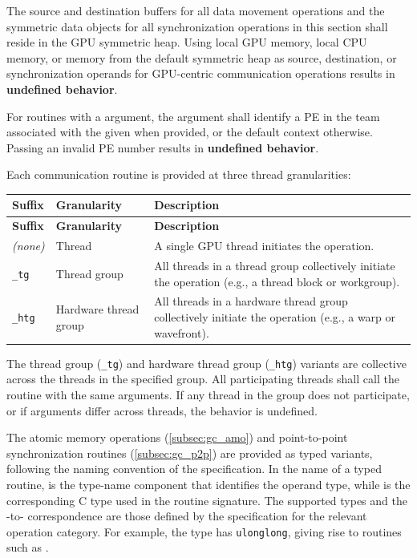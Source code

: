 
The source and destination buffers for all data movement operations and the
symmetric data objects for all synchronization operations in this section shall
reside in the \ac{GPU} symmetric heap. Using local \ac{GPU} memory, local CPU
memory, or memory from the default symmetric heap as source, destination, or
synchronization operands for GPU-centric communication operations results in
\textbf{undefined behavior}.

For routines with a  argument, the  argument shall identify a
\ac{PE} in the team associated with the given  when provided, or the
default context otherwise. Passing an invalid \ac{PE} number results in
\textbf{undefined behavior}.

Each communication routine is provided at three thread granularities:

\begin{longtable}{|p{3cm}|p{3cm}|p{8.5cm}|}
\hline
\textbf{Suffix} & \textbf{Granularity} & \textbf{Description} \\
\hline
\endfirsthead
\hline
\textbf{Suffix} & \textbf{Granularity} & \textbf{Description} \\
\hline
\endhead
\emph{(none)} & Thread & A single \ac{GPU} thread initiates the operation. \\
\hline
\texttt{\_tg} & Thread group & All threads in a thread group collectively initiate
the operation (e.g., a thread block or workgroup). \\
\hline
\texttt{\_htg} & Hardware thread group & All threads in a hardware thread group
collectively initiate the operation (e.g., a warp or wavefront). \\
\hline
\end{longtable}

The thread group (\texttt{\_tg}) and hardware thread group (\texttt{\_htg})
variants are collective across the threads in the specified group. All
participating threads shall call the routine with the same arguments. If any
thread in the group does not participate, or if arguments differ across threads,
the behavior is undefined.

The atomic memory operations (\cref{subsec:gc_amo}) and point-to-point
synchronization routines (\cref{subsec:gc_p2p}) are provided as typed variants,
following the naming convention of the  specification. In the name
of a typed routine, \TYPENAME{} is the type-name component that identifies the
operand type, while \TYPE{} is the corresponding C type used in the routine
signature. The supported types and the \TYPE{}-to-\TYPENAME{} correspondence are
those defined by the  specification for the relevant operation
category. For example, the type \TYPE{}  has
\TYPENAME{} \texttt{ulonglong}, giving rise to routines such as
.

